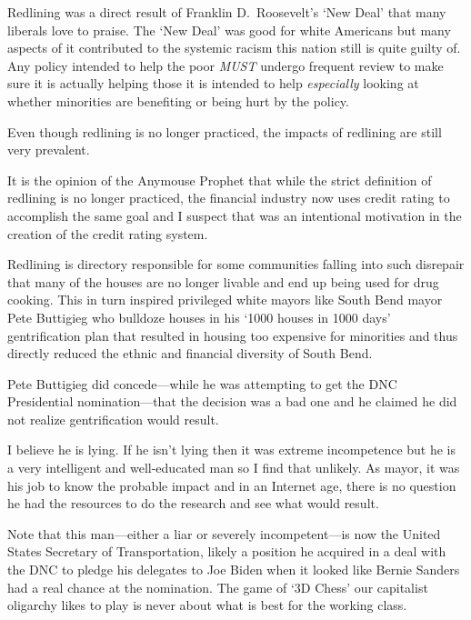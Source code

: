 Redlining was a direct result of Franklin D.\ Roosevelt's `New Deal' that many liberals love to praise. The `New Deal' was good for white Americans but many aspects of it contributed to the systemic racism this nation still is quite guilty of. Any policy intended to help the poor \emph{MUST} undergo frequent review to make sure it is actually helping those it is intended to help \emph{especially} looking at whether minorities are benefiting or being hurt by the policy.

Even though redlining is no longer practiced, the impacts of redlining are still very prevalent.

It is the opinion of the Anymouse Prophet that while the strict definition of redlining is no longer practiced, the financial industry now uses credit rating to accomplish the same goal and I suspect that was an intentional motivation in the creation of the credit rating system.

Redlining is directory responsible for some communities falling into such disrepair that many of the houses are no longer livable and end up being used for drug cooking. This in turn inspired privileged white mayors like South Bend mayor Pete Buttigieg who bulldoze houses in his `\num[group-separator={,}]{1000} houses in \num[group-separator={,}]{1000} days' gentrification plan that resulted in housing too expensive for minorities and thus directly reduced the ethnic and financial diversity of South Bend.

Pete Buttigieg did concede---while he was attempting to get the DNC Presidential nomination---that the decision was a bad one and he claimed he did not realize gentrification would result.

I believe he is lying. If he isn't lying then it was extreme incompetence but he is a very intelligent and well-educated man so I find that unlikely. As mayor, it was his job to know the probable impact and in an Internet age, there is no question he had the resources to do the research and see what would result.

Note that this man---either a liar or severely incompetent---is now the United States Secretary of Transportation, likely a position he acquired in a deal with the DNC to pledge his delegates to Joe Biden when it looked like Bernie Sanders had a real chance at the nomination. The game of `3D Chess' our capitalist oligarchy likes to play is never about what is best for the working class.

